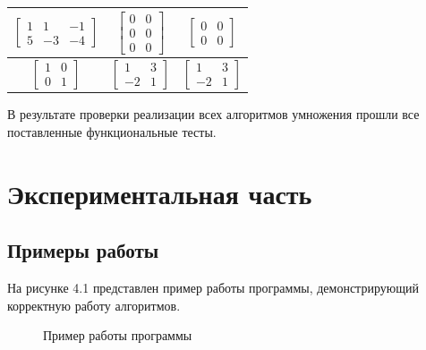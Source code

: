 \documentclass[12pt, a4paper]{report}
\begin{document}
\begin{table}[ht!]
\begin{center}
\begin{tabular}{|c|c|c|}
			$\begin{bmatrix}1 & 1 & -1\\5 & -3 & -4\end{bmatrix}$ &
			$\begin{bmatrix}0 & 0\\0 & 0\\0 & 0\end{bmatrix}$ &
			$\begin{bmatrix}0 & 0\\0 & 0\end{bmatrix}$\\\hline
			
			$\begin{bmatrix}1 & 0\\0 & 1\end{bmatrix}$ &
			$\begin{bmatrix}1 & 3\\-2 & 1\end{bmatrix}$ &
			$\begin{bmatrix}1 & 3\\-2 & 1\end{bmatrix}$\\\hline

			\end{tabular}
		\end{center}
	\end{table}

	В результате проверки реализации всех алгоритмов умножения прошли все поставленные функциональные тесты.

	\chapter{Экспериментальная часть}
	\section{Примеры работы}
	На рисунке 4.1 представлен пример работы программы, демонстрирующий корректную работу алгоритмов.
	\begin{figure}[ht!]
		\centering
		\caption{Пример работы программы}
		\label{fig:example}
	\end{figure}
	
\end{document}
